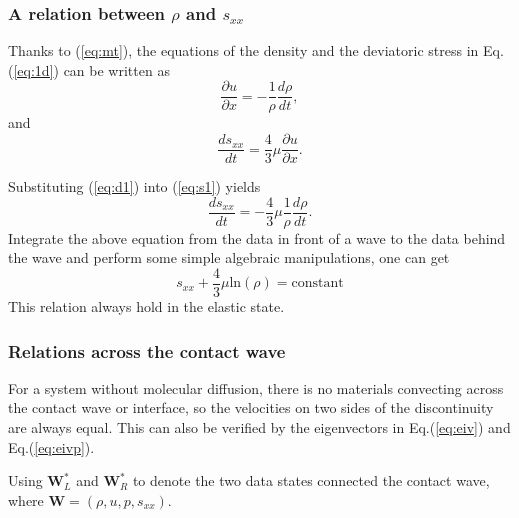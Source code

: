 \documentclass[review]{elsarticle}
\begin{document}
\subsubsection{A relation between $\rho$ and $s_{xx}$ }

Thanks to (\ref{eq:mt}), the equations of the density and the deviatoric stress in Eq.(\ref{eq:1d}) can be written as
  \begin{equation}\label{eq:d1}
    \frac{\partial u}{\partial x} = -\frac{1}{\rho}\frac{d\rho}{dt},
  \end{equation}
  and
  \begin{equation}\label{eq:s1}
    \frac{ds_{xx}}{dt}=\frac{4}{3}\mu\frac{\partial u}{\partial x}.
  \end{equation}

  Substituting (\ref{eq:d1}) into (\ref{eq:s1}) yields
  \begin{equation}
    \frac{ds_{xx}}{dt}=-\frac{4}{3}\mu \frac{1}{\rho}\frac{d\rho}{dt}.
\end{equation}
Integrate the above equation from the data in front of a wave to the data behind the wave and perform some simple algebraic manipulations, one can get
\begin{equation}\label{eq:rhosxx}
  s_{xx}+\frac{4}{3}\mu\text{ln}(\rho) = \text{constant}
\end{equation}
This relation always hold in the elastic state.

\subsubsection{Relations across the contact wave}\label{sec:contact}
  For  a  system without molecular diffusion, there is no materials convecting  across the contact wave or interface, so the velocities on two sides of  the discontinuity are always equal. %
  This can also be verified by the eigenvectors  in Eq.(\ref{eq:eiv}) and  Eq.(\ref{eq:eivp}).  

Using $\mathbf{W}_L^*$ and $\mathbf{W}_R^*$ to denote the two data states connected the contact wave, where $\mathbf{W}=\left(\rho,u,p,s_{xx}\right)$.
\end{document}
